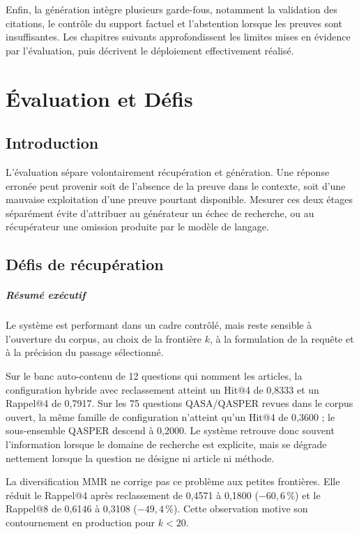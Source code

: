 Enfin, la génération intègre plusieurs garde-fous, notamment la validation des
citations, le contrôle du support factuel et l'abstention lorsque les preuves sont
insuffisantes. Les chapitres suivants approfondissent les limites mises en évidence par l'évaluation,
puis décrivent le déploiement effectivement réalisé.
\chapter{Évaluation et Défis}

\section*{Introduction}

L'évaluation sépare volontairement récupération et génération. Une réponse erronée
peut provenir soit de l'absence de la preuve dans le contexte, soit d'une mauvaise
exploitation d'une preuve pourtant disponible. Mesurer ces deux étages séparément
évite d'attribuer au générateur un échec de recherche, ou au récupérateur une
omission produite par le modèle de langage.

\section{Défis de récupération}

\paragraph{Résumé exécutif}

Le système est performant dans un cadre contrôlé, mais reste sensible à l'ouverture
du corpus, au choix de la frontière \(k\), à la formulation de la requête et à la
précision du passage sélectionné.

Sur le banc auto-contenu de 12 questions qui nomment les articles, la configuration
hybride avec reclassement atteint un Hit@4 de 0,8333 et un Rappel@4 de 0,7917.
Sur les 75 questions QASA/QASPER revues dans le corpus ouvert, la même famille de
configuration n'atteint qu'un Hit@4 de 0,3600 ; le sous-ensemble QASPER descend à
0,2000. Le système retrouve donc souvent l'information lorsque le domaine de
recherche est explicite, mais se dégrade nettement lorsque la question ne désigne
ni article ni méthode.

La diversification MMR ne corrige pas ce problème aux petites frontières. Elle
réduit le Rappel@4 après reclassement de 0,4571 à 0,1800 (\(-60,6\,\%\)) et le
Rappel@8 de 0,6146 à 0,3108 (\(-49,4\,\%\)). Cette observation motive son
contournement en production pour \(k<20\).

